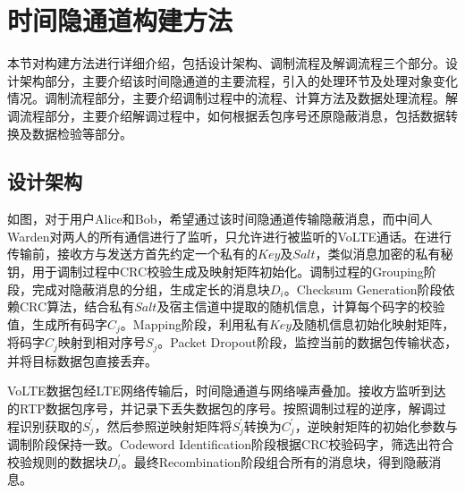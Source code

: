 \section{时间隐通道构建方法}
\label{chap:zigzag:model}

本节对构建方法进行详细介绍，包括设计架构、调制流程及解调流程三个部分。设计架构部分，主要介绍该时间隐通道的主要流程，引入的处理环节及处理对象变化情况。调制流程部分，主要介绍调制过程中的流程、计算方法及数据处理流程。解调流程部分，主要介绍解调过程中，如何根据丢包序号还原隐蔽消息，包括数据转换及数据检验等部分。

\subsection{设计架构}
\label{chap:zigzag:model:system}


如图，对于用户Alice和Bob，希望通过该时间隐通道传输隐蔽消息，而中间人Warden对两人的所有通信进行了监听，只允许进行被监听的VoLTE通话。在进行传输前，接收方与发送方首先约定一个私有的$Key$及$Salt$，类似消息加密的私有秘钥，用于调制过程中CRC校验生成及映射矩阵初始化。调制过程的Grouping阶段，完成对隐蔽消息的分组，生成定长的消息块$D_{i}$。Checksum Generation阶段依赖CRC算法，结合私有$Salt$及宿主信道中提取的随机信息，计算每个码字的校验值，生成所有码字$C_{j}$。Mapping阶段，利用私有$Key$及随机信息初始化映射矩阵，将码字$C_{j}$映射到相对序号$S_{j}$。Packet Dropout阶段，监控当前的数据包传输状态，并将目标数据包直接丢弃。

VoLTE数据包经LTE网络传输后，时间隐通道与网络噪声叠加。接收方监听到达的RTP数据包序号，并记录下丢失数据包的序号。按照调制过程的逆序，解调过程识别获取的$S_{j}^{'}$，然后参照逆映射矩阵将$S_{j}^{'}$转换为$C_{j}^{'}$，逆映射矩阵的初始化参数与调制阶段保持一致。Codeword Identification阶段根据CRC校验码字，筛选出符合校验规则的数据块$D_{i}^{'}$。最终Recombination阶段组合所有的消息块，得到隐蔽消息。

